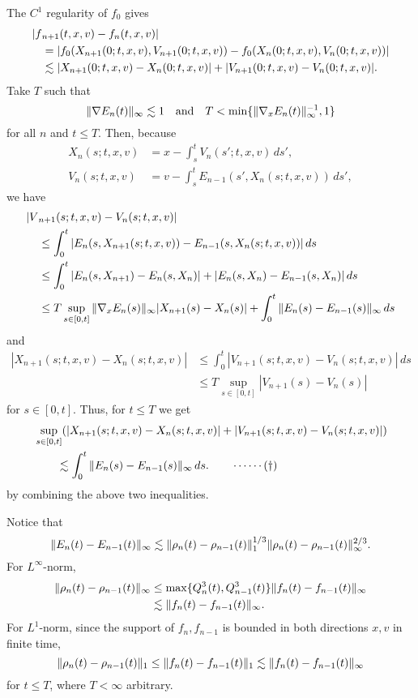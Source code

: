 \documentclass[11pt]{amsart}
\begin{document}
\begin{pfs}
\item
The $C^1$ regularity of $f_0$ gives
\begin{align*}
|f&_{n+1}(t,x,v)-f_n(t,x,v)|\\
&=|f_0(X_{n+1}(0;t,x,v),V_{n+1}(0;t,x,v))-f_0(X_n(0;t,x,v),V_n(0;t,x,v))|\\
&\lesssim|X_{n+1}(0;t,x,v)-X_n(0;t,x,v)|+|V_{n+1}(0;t,x,v)-V_n(0;t,x,v)|.
\end{align*}
Take $T$ such that
\[\|\nabla E_n(t)\|_\infty\lesssim1\quad\text{and}\quad T<\min\{\|\nabla_xE_n(t)\|_\infty^{-1},1\}\]
for all $n$ and $t\le T$.
Then, because
\begin{align*}
X_n(s;t,x,v)&=x-\int_s^tV_n(s';t,x,v)\,ds',\\
V_n(s;t,x,v)&=v-\int_s^tE_{n-1}(s',X_n(s;t,x,v))\,ds',
\end{align*}
we have
\begin{align*}
|V&_{n+1}(s;t,x,v)-V_n(s;t,x,v)|\\
&\le\int_0^t|E_n(s,X_{n+1}(s;t,x,v))-E_{n-1}(s,X_n(s;t,x,v))|\,ds\\
&\le\int_0^t|E_n(s,X_{n+1})-E_n(s,X_n)|+|E_n(s,X_n)-E_{n-1}(s,X_n)|\,ds\\
&\le T\sup_{s\in[0,t]}\|\nabla_xE_n(s)\|_\infty|X_{n+1}(s)-X_n(s)|+\int_0^t\|E_n(s)-E_{n-1}(s)\|_\infty\,ds
\end{align*}
and
\begin{align*}
|X_{n+1}(s;t,x,v)-X_n(s;t,x,v)|
&\le\int_0^t|V_{n+1}(s;t,x,v)-V_n(s;t,x,v)|\,ds\\
&\le T\sup_{s\in[0,t]}|V_{n+1}(s)-V_n(s)|
\end{align*}
for $s\in[0,t]$.
Thus, for $t\le T$ we get
\begin{align*}
&\sup_{s\in[0,t]}(|X_{n+1}(s;t,x,v)-X_n(s;t,x,v)|+|V_{n+1}(s;t,x,v)-V_n(s;t,x,v)|)\\
&\qquad\lesssim\int_0^t\|E_n(s)-E_{n-1}(s)\|_\infty\,ds.\qquad\cdots\cdots(\dagger)
\end{align*}
by combining the above two inequalities.

\item
Notice that
\[\|E_n(t)-E_{n-1}(t)\|_\infty\lesssim\|\rho_n(t)-\rho_{n-1}(t)\|_1^{1/3}\|\rho_n(t)-\rho_{n-1}(t)\|_\infty^{2/3}.\]
For $L^\infty$-norm,
\begin{align*}
\|\rho_n(t)-\rho_{n-1}(t)\|_\infty
&\le\max\{Q_n^3(t),Q_{n-1}^3(t)\}\|f_n(t)-f_{n-1}(t)\|_\infty\\
&\lesssim\|f_n(t)-f_{n-1}(t)\|_\infty.
\end{align*}
For $L^1$-norm, since the support of $f_n,f_{n-1}$ is bounded in both directions $x,v$ in finite time,
\[\|\rho_n(t)-\rho_{n-1}(t)\|_1\le\|f_n(t)-f_{n-1}(t)\|_1\lesssim\|f_n(t)-f_{n-1}(t)\|_\infty\]
for $t\le T$, where $T<\infty$ arbitrary.


\end{pfs}
\end{document}
